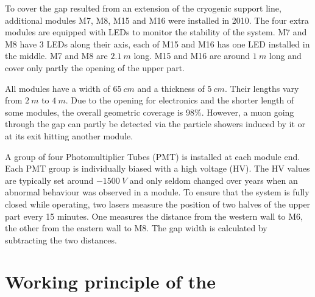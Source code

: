 To cover the gap resulted from an extension of the cryogenic support line, additional modules M7, M8, M15 and M16 were installed in 2010. The four extra modules are equipped with LEDs to monitor the stability of the system. M7 and M8 have 3 LEDs along their axis, each of M15 and M16 has one LED installed in the middle. M7 and M8 are $\SI{2.1}{m}$ long. M15 and M16 are around $\SI{1}{m}$ long and cover only partly the opening of the upper part.

All modules have a width of $\SI{65}{cm}$ and a thickness of $\SI{5}{cm}$. Their lengths vary from $\SI{2}{m}$ to $\SI{4}{m}$.
Due to the opening for electronics and the shorter length of some modules, the overall geometric coverage is 98\%. However, a muon going through the gap can partly be detected via the particle showers induced by it or at its exit hitting another module.

A group of four Photomultiplier Tubes (PMT) is installed at each module end. Each PMT group is individually biased with a high voltage (HV). The HV values are typically set around $\SI{-1500}{V}$ and only seldom changed over years when an abnormal behaviour was observed in a module. To ensure that the system is fully closed while operating, two lasers measure the position of two halves of the upper part every 15 minutes. One measures the distance from the western wall to M6, the other from the eastern wall to M8. The gap width is calculated by subtracting the two distances.


\section{Working principle of the \mvs}
\label{sec:muon-working}


